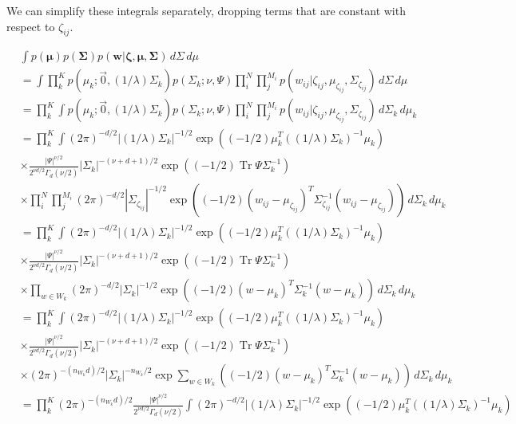 \documentclass[12pt]{article}
\DeclareMathOperator{\Tr}{Tr}
\begin{document}
We can simplify these integrals separately, dropping terms that are constant with respect to $\zeta_{ij}$.

\begin{align*}
& \int p(\bm{\mu})p(\bm{\Sigma})p(\bm{w} | \bm{\zeta}, \bm{\mu}, \bm{\Sigma})\,d\Sigma \,d\mu \\
& = \int \prod^{K}_{k} p(\mu_k; \vec{0}, (1/\lambda)\Sigma_k)p(\Sigma_k; \nu, \Psi) \prod^{N}_i \prod^{M_i}_j p(w_{ij} | \zeta_{ij}, \mu_{\zeta_{ij}}, \Sigma_{\zeta_{ij}}) \,d\Sigma \,d\mu \\
& = \prod^{K}_{k} \int p(\mu_k; \vec{0}, (1/\lambda)\Sigma_k)p(\Sigma_k; \nu, \Psi) \prod^{N}_i \prod^{M_i}_j p(w_{ij} | \zeta_{ij}, \mu_{\zeta_{ij}}, \Sigma_{\zeta_{ij}}) \,d\Sigma_k \,d\mu_k \\
& = \prod^{K}_{k} \int (2\pi)^{-d/2} |(1/\lambda)\Sigma_k|^{-1/2} \exp{((-1/2)\mu_k^T((1/\lambda)\Sigma_k)^{-1}\mu_k)} \\
& \times \frac{|\Psi|^{\nu/2}}{2^{\nu d/2}\Gamma_d(\nu/2)} |\Sigma_k|^{-(\nu + d + 1)/2} \exp{((-1/2) \Tr{\Psi \Sigma_k^{-1}})} \\
& \times \prod^{N}_i \prod^{M_i}_j (2\pi)^{-d/2} |\Sigma_{\zeta_{ij}}|^{-1/2} \exp{((-1/2)(w_{ij} - \mu_{\zeta_{ij}})^T\Sigma_{{\zeta_{ij}}}^{-1}(w_{ij} - \mu_{{\zeta_{ij}}}))}  \,d\Sigma_k  \,d\mu_k \\
& = \prod^{K}_{k} \int (2\pi)^{-d/2} |(1/\lambda)\Sigma_k|^{-1/2} \exp{((-1/2)\mu_k^T((1/\lambda)\Sigma_k)^{-1}\mu_k)} \\
& \times \frac{|\Psi|^{\nu/2}}{2^{\nu d/2}\Gamma_d(\nu/2)} |\Sigma_k|^{-(\nu + d + 1)/2} \exp{((-1/2) \Tr{\Psi \Sigma_k^{-1}})} \\
& \times \prod_{w \in W_k} (2\pi)^{-d/2} |\Sigma_k|^{-1/2} \exp{((-1/2)(w - \mu_{k})^T\Sigma_{k}^{-1}(w - \mu_{k}))}  \,d\Sigma_k  \,d\mu_k \\
& = \prod^{K}_{k} \int (2\pi)^{-d/2} |(1/\lambda)\Sigma_k|^{-1/2} \exp{((-1/2)\mu_k^T((1/\lambda)\Sigma_k)^{-1}\mu_k)} \\
& \times \frac{|\Psi|^{\nu/2}}{2^{\nu d/2}\Gamma_d(\nu/2)} |\Sigma_k|^{-(\nu + d + 1)/2} \exp{((-1/2) \Tr{\Psi \Sigma_k^{-1}})} \\
& \times (2\pi)^{-(n_{W_k}d)/2}|\Sigma_k|^{-n_{W_k}/2}\exp{\sum_{w \in W_k} ((-1/2)(w - \mu_{k})^T\Sigma_{k}^{-1}(w - \mu_{k}))}  \,d\Sigma_k  \,d\mu_k \\
& = \prod^{K}_{k} (2\pi)^{-(n_{W_k}d)/2}\frac{|\Psi|^{\nu/2}}{2^{\nu d/2}\Gamma_d(\nu/2)} \int (2\pi)^{-d/2} |(1/\lambda)\Sigma_k|^{-1/2} \exp{((-1/2)\mu_k^T((1/\lambda)\Sigma_k)^{-1}\mu_k)} \\

\end{align*}
\end{document}
